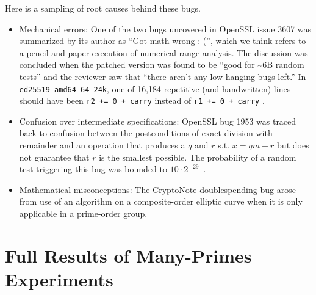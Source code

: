 \documentclass[conference,letterpaper]{IEEEtran}
\begin{document}
Here is a sampling of root causes behind these bugs.
\begin{itemize}
\item Mechanical errors:
One of the two bugs uncovered in OpenSSL issue 3607 was summarized by its author as ``Got math wrong :-('', which we think refers to a pencil-and-paper execution of numerical range analysis.
    The discussion was concluded when the patched version was found to be ``good for \textasciitilde{}6B random tests'' and the reviewer saw that ``there aren't any low-hanging bugs left.''
In \texttt{ed25519-amd64-64-24k}, one of 16,184 repetitive (and handwritten) lines should have been \texttt{r2 += 0 + carry} instead of \texttt{r1 += 0 + carry} \cite[p. 2]{TweetNaCl}.
\item Confusion over intermediate specifications:
OpenSSL bug 1953 was traced back to confusion between the postconditions of exact division with remainder and an operation that produces a $q$ and $r$ s.t. $x = qm + r$ but does not guarantee that $r$ is the smallest possible.
    The probability of a random test triggering this bug was bounded to $10\cdot{}2^{-29}$~\cite{OpenSSLBignumExploit}.
\item Mathematical misconceptions:
  The
    \href{https://getmonero.org/2017/05/17/disclosure-of-a-major-bug-in-cryptonote-based-currencies.html}{CryptoNote
    doublespending bug} arose from use of an algorithm on a composite-order
    elliptic curve when it is only applicable in a prime-order group.
\end{itemize}

\section{\label{data}Full Results of Many-Primes Experiments}
\end{document}
